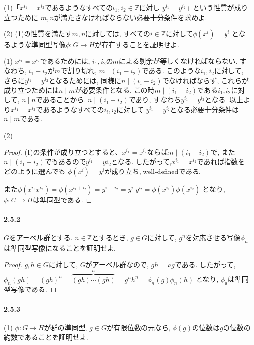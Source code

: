 (1)「$x^{i_1}=x^{i_2}$であるようなすべての$i_1,i_2 \in \mathbb{Z}$に対し
$y^{i_1}=y^{i_2}$」という性質が成り立つために
$m,n$が満たさなければならない必要十分条件を求めよ.

(2) (1)の性質を満たす$m,n$に対しては,
すべての$i \in \mathbb{Z}$に対して$\phi(x^i)=y^i$
となるような準同型写像$\phi:G \to H$が存在することを証明せよ.\newline

(1) $x^{i_1}=x^{i_2}$であるためには, 
$i_1, i_2$の$m$による剰余が等しくなければならない.
すなわち, $i_1-i_2$が$m$で割り切れ, $m \mid (i_1-i_2)$である.
このような$i_1, i_2$に対して, さらに$y^{i_1}=y^{i_2}$となるためには,
同様に$n\mid (i_1-i_2)$でなければならず, 
これらが成り立つためには$n\mid m$が必要条件となる.
この時$m \mid (i_1-i_2)$である$i_1,i_2$に対して,
$n \mid n$であることから, $n \mid (i_1-i_2)$であり,
すなわち$y^{i_1}=y^{i_2}$となる.
以上より$x^{i_1}=x^{i_2}$であるようなすべての$i_i,i_2$に対して
$y^{i_1}=y^{i_2}$となる必要十分条件は$n \mid m$である.

(2) 
\begin{proof}
  (1)の条件が成り立つとすると、$x^{i_1}=x^{i_2}$ならば$m\mid (i_1 - i_2)$で,
  また$n\mid (i_1 - i_2)$でもあるので$y^{i_1}=y{i_2}$となる.
  したがって,$x^{i_1}=x^{i_2}$であれば指数をどのように選んでも
  $\phi(x^i)=y^i$が成り立ち, well-definedである.
  
  また$\phi(x^{i_1}x^{i_2})=\phi(x^{i_1+i_2})=y^{i_1+i_2}=y^{i_1}y^{i_2}=\phi(x^{i_1})\phi(x^{i_2})$
  となり, $\phi: G\to H$は準同型である.
\end{proof}

\paragraph{2.5.2} $G$をアーベル群とする. $n \in \mathbb{Z}$とするとき,
$g \in G$に対して, $g^n$を対応させる写像$\phi_n$は準同型写像になることを証明せよ.
\begin{proof}
  $g,h\in G$に対して, $G$がアーベル群なので, $gh=hg$である.
  したがって, $\phi_n(gh)=(gh)^n=\overbrace{(gh)\cdots(gh)}^n=g^n h^n=\phi_n(g)\phi_n(h)$
  となり, $\phi_n$は準同型写像である.
\end{proof}\leavevmode

\paragraph{2.5.3} (1) $\phi:G \to H$が群の準同型, $g \in G$が有限位数の元なら,
$\phi(g)$の位数は$g$の位数の約数であることを証明せよ.

